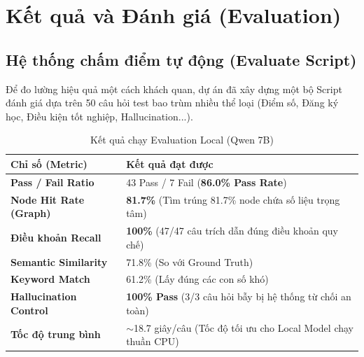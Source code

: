 \documentclass[12pt,a4paper]{article}
\begin{document}
\section{Kết quả và Đánh giá (Evaluation)}

\subsection{Hệ thống chấm điểm tự động (Evaluate Script)}
Để đo lường hiệu quả một cách khách quan, dự án đã xây dựng một bộ Script đánh giá dựa trên 50 câu hỏi test bao trùm nhiều thể loại (Điểm số, Đăng ký học, Điều kiện tốt nghiệp, Hallucination...).

\begin{table}[H]
\centering
\caption{Kết quả chạy Evaluation Local (Qwen 7B)}
\begin{tabularx}{\textwidth}{lX}
\toprule
\textbf{Chỉ số (Metric)} & \textbf{Kết quả đạt được} \\
\midrule
\textbf{Pass / Fail Ratio} & 43 Pass / 7 Fail (\textbf{86.0\% Pass Rate}) \\
\textbf{Node Hit Rate (Graph)} & \textbf{81.7\%} (Tìm trúng 81.7\% node chứa số liệu trọng tâm) \\
\textbf{Điều khoản Recall} & \textbf{100\%} (47/47 câu trích dẫn đúng điều khoản quy chế) \\
\textbf{Semantic Similarity} & 71.8\% (So với Ground Truth) \\
\textbf{Keyword Match} & 61.2\% (Lấy đúng các con số khó) \\
\textbf{Hallucination Control} & \textbf{100\% Pass} (3/3 câu hỏi bẫy bị hệ thống từ chối an toàn) \\
\textbf{Tốc độ trung bình} & $\sim$18.7 giây/câu (Tốc độ tối ưu cho Local Model chạy thuần CPU) \\
\bottomrule
\end{tabularx}
\end{table}
\end{document}
